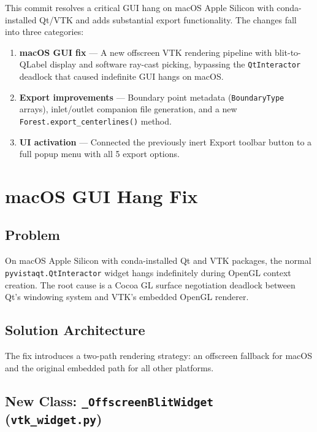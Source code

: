\documentclass[11pt,a4paper]{article}
\begin{document}
This commit resolves a critical GUI hang on macOS Apple Silicon with conda-installed Qt/VTK and adds substantial export functionality. The changes fall into three categories:

\begin{enumerate}[leftmargin=2em]
    \item \textbf{macOS GUI fix} --- A new offscreen VTK rendering pipeline with blit-to-QLabel display and software ray-cast picking, bypassing the \texttt{QtInteractor} deadlock that caused indefinite GUI hangs on macOS.
    \item \textbf{Export improvements} --- Boundary point metadata (\texttt{BoundaryType} arrays), inlet/outlet companion file generation, and a new \texttt{Forest.export\_centerlines()} method.
    \item \textbf{UI activation} --- Connected the previously inert Export toolbar button to a full popup menu with all 5 export options.
\end{enumerate}

\section{macOS GUI Hang Fix}

\subsection{Problem}

On macOS Apple Silicon with conda-installed Qt and VTK packages, the normal \texttt{pyvistaqt.QtInteractor} widget hangs indefinitely during OpenGL context creation. The root cause is a Cocoa GL surface negotiation deadlock between Qt's windowing system and VTK's embedded OpenGL renderer.

\subsection{Solution Architecture}

The fix introduces a two-path rendering strategy: an offscreen fallback for macOS and the original embedded path for all other platforms.

\subsection{New Class: \texttt{\_OffscreenBlitWidget} (\texttt{vtk\_widget.py})}
\end{document}
